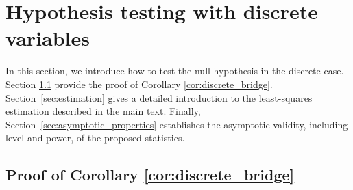 \documentclass[
  12pt]{article}
\def\cX{\mathcal{X}}
\def\cY{\mathcal{Y}}
\begin{document}
\section{Hypothesis testing with discrete variables}\label{sec:discrete_integral}

 
In this section, we introduce how to test the null hypothesis in the discrete case. Section \ref{appx.corollary} provide the proof of Corollary \ref{cor:discrete_bridge}. Section~\ref{sec:estimation} gives a detailed introduction to the least-squares estimation described in the main text. Finally, Section~\ref{sec:asymptotic_properties} establishes the asymptotic validity, including level and power, of the proposed statistics.


\subsection{Proof of Corollary \ref{cor:discrete_bridge}}\label{appx.corollary}

\end{document}
